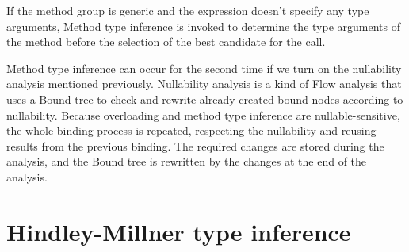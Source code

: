 If the method group is generic and the expression doesn’t specify any type arguments, Method type inference is invoked to determine the type arguments of the method before the selection of the best candidate for the call.
\par
{}
Method type inference can occur for the second time if we turn on the nullability analysis mentioned previously. 
Nullability analysis is a kind of Flow analysis that uses a Bound tree to check and rewrite already created bound nodes according to nullability. 
Because overloading and method type inference are nullable-sensitive, the whole binding process is repeated, respecting the nullability and reusing results from the previous binding. 
The required changes are stored during the analysis, and the Bound tree is rewritten by the changes at the end of the analysis.

\section{Hindley-Millner type inference}

